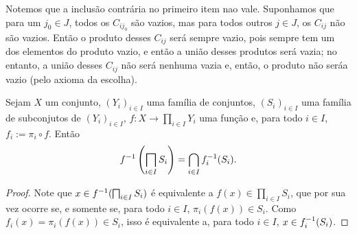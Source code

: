 Notemos que a inclusão contrária no primeiro item nao vale. Suponhamos que para um $j_0 \in J$, todos os $C_{ij_0}$ são vazios, mas para todos outros $j \in J$, os $C_{ij}$ não são vazios. Então o produto desses $C_{ij}$ será sempre vazio, pois sempre tem um dos elementos do produto vazio, e então a união desses produtos será vazia; no entanto, a união desses $C_{ij}$ não será nenhuma vazia e, então, o produto não seráa vazio (pelo axioma da escolha).

\begin{proposition}
\label{conj:proposition.im.inv.prod}
Sejam $X$ um conjunto, $(Y_i)_{i \in I}$ uma família de conjuntos, $(S_i)_{i \in I}$ uma família de subconjutos de $(Y_i)_{i \in I}$, $f: X \to \prod_{i \in I} Y_i$ uma função e, para todo $i \in I$, $f_i := \pi_i \circ f$. Então
	\begin{equation*}
	f\inv\left( \prod_{i \in I} {S_i} \right) = \bigcap_{i \in I} f_i\inv (S_i).
	\end{equation*}
\end{proposition}
\begin{proof}
Note que $x \in f\inv(\prod_{i \in I} {S_i})$ é equivalente a $f(x) \in \prod_{i \in I} {S_i}$, que por sua vez ocorre se, e somente se, para todo $i \in I$, $\pi_i(f(x)) \in S_i$. Como $f_i(x)=\pi_i(f(x)) \in S_i$, isso é equivalente a, para todo $i \in I$, $x \in f_i^{-1} (S_i)$.
\end{proof}










